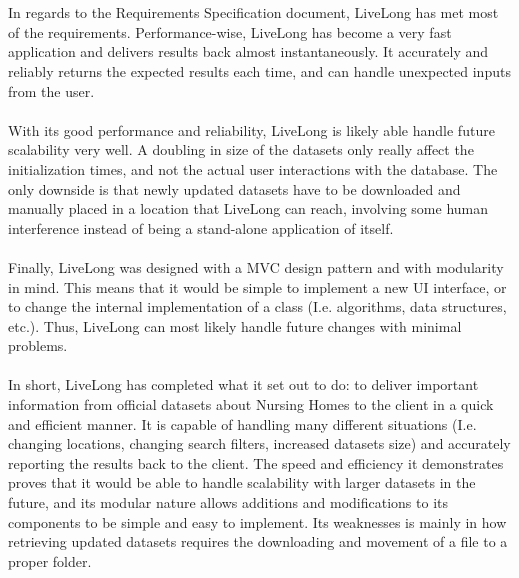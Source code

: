 \documentclass[12pt]{article}
\begin{document}
\\ \\
In regards to the Requirements Specification document, LiveLong has met most of the requirements. Performance-wise, LiveLong has become a very fast application and delivers results back almost instantaneously. It accurately and reliably returns the expected results each time, and can handle unexpected inputs from the user.
\\ \\
With its good performance and reliability, LiveLong is likely able handle future scalability very well. A doubling in size of the datasets only really affect the initialization times, and not the actual user interactions with the database. The only downside is that newly updated datasets have to be downloaded and manually placed in a location that LiveLong can reach, involving some human interference instead of being a stand-alone application of itself.
\\ \\
Finally, LiveLong was designed with a MVC design pattern and with modularity in mind. This means that it would be simple to implement a new UI interface, or to change the internal implementation of a class (I.e. algorithms, data structures, etc.). Thus, LiveLong can most likely handle future changes with minimal problems.
\\ \\
In short, LiveLong has completed what it set out to do: to deliver important information from official datasets about Nursing Homes to the client in a quick and efficient manner. It is capable of handling many different situations (I.e. changing locations, changing search filters, increased datasets size) and accurately reporting the results back to the client. The speed and efficiency it demonstrates proves that it would be able to handle scalability with larger datasets in the future, and its modular nature allows additions and modifications to its components to be simple and easy to implement. Its weaknesses is mainly in how retrieving updated datasets requires the downloading and movement of a file to a proper folder.
\end{document}

